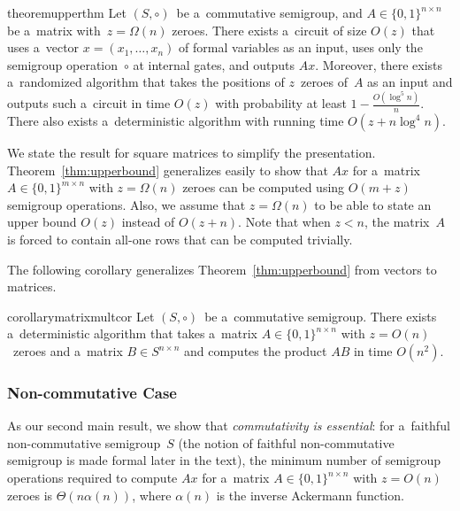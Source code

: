 \documentclass[a4paper,UKenglish,cleveref, autoref]{lipics-v2019}
\begin{document}
\begin{restatable}{theorem}{upperthm}
\label{thm:upperbound}
Let $(S, \circ)$~be a~commutative semigroup,
and $A \in \{0,1\}^{n \times n}$ be a~matrix
with~$z=\Omega(n)$ zeroes.
There exists a~circuit of size $O(z)$ that uses
a~vector $x = (x_1,\ldots, x_n)$ of formal variables as an input,
uses only the semigroup operation~$\circ$ at internal gates,
and outputs $Ax$. Moreover, there exists a~randomized
algorithm that takes the positions of $z$~zeroes of~$A$
as an input and outputs such a~circuit in time $O(z)$
with probability at least $1-\frac{O(\log^5n)}{n}$. There also
exists a~deterministic algorithm with running time $O(z+n\log^4n)$.
\end{restatable}

We state the result for square matrices to simplify the presentation. Theorem~\ref{thm:upperbound} generalizes easily
to show that $Ax$ for a~matrix $A \in \{0,1\}^{m \times n}$ with $z=\Omega(n)$ zeroes can be computed using $O(m+z)$ semigroup operations. Also,
we assume that $z=\Omega(n)$ to be able to state an upper bound $O(z)$ instead of $O(z+n)$. Note that when
$z<n$, the matrix~$A$ is forced to contain all-one rows
that can be computed trivially.

The following corollary generalizes Theorem~\ref{thm:upperbound}
from vectors to matrices.

\begin{restatable}{corollary}{matrixmultcor}
\label{cor:matrixmultiplication}
Let $(S, \circ)$~be a~commutative semigroup.
There exists a~deterministic algorithm that takes
a~matrix $A \in \{0,1\}^{n \times n}$ with
$z=O(n)$~zeroes
and a~matrix $B \in S^{n \times n}$ and computes
the product $AB$ in time $O(n^2)$.
\end{restatable}

\subsubsection{Non-commutative Case}
As our second main result, we show that \emph{commutativity is essential}: for
a~faithful non-commutative semigroup~$S$
(the notion of faithful non-commutative semigroup  is made formal
later in the text), the minimum number of semigroup operations
required to compute $Ax$ for a~matrix
$A \in \{0,1\}^{n \times n}$ with $z=O(n)$ zeroes is
$\Theta(n\alpha(n))$, where $\alpha(n)$ is the inverse Ackermann function.
\end{document}
